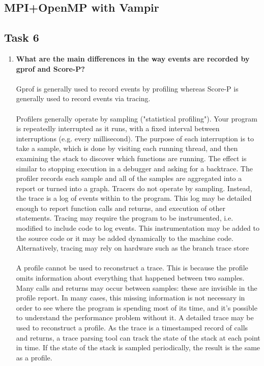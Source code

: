 \documentclass[10pt, letterpaper, twoside]{article}
\begin{document}
\begin{titlepage}
\section{MPI+OpenMP with Vampir}

\subsection{Task 6}

\begin{enumerate}

\item \textbf{What are the main differences in the way events are recorded by gprof and Score-P?} \\ \\
Gprof is generally used to record events by profiling whereas Score-P is generally used to record events via tracing. \\ \\
Profilers generally operate by sampling ("statistical profiling"). Your program is repeatedly interrupted as it runs, with a fixed interval between interruptions (e.g. every millisecond). The purpose of each interruption is to take a sample, which is done by visiting each running thread, and then examining the stack to discover which functions are running. The effect is similar to stopping execution in a debugger and asking for a backtrace. The profiler records each sample and all of the samples are aggregated into a report or turned into a graph. Tracers do not operate by sampling. Instead, the trace is a log of events within to the program. This log may be detailed enough to report function calls and returns, and execution of other statements. Tracing may require the program to be instrumented, i.e. modified to include code to log events. This instrumentation may be added to the source code or it may be added dynamically to the machine code. Alternatively, tracing may rely on hardware such as the branch trace store \\ \\
A profile cannot be used to reconstruct a trace. This is because the profile omits information about everything that happened between two samples. Many calls and returns may occur between samples: these are invisible in the profile report. In many cases, this missing information is not necessary in order to see where the program is spending most of its time, and it's possible to understand the performance problem without it. A detailed trace may be used to reconstruct a profile. As the trace is a timestamped record of calls and returns, a trace parsing tool can track the state of the stack at each point in time. If the state of the stack is sampled periodically, the result is the same as a profile. \\ \\

\end{enumerate}
\end{titlepage}
\end{document}
